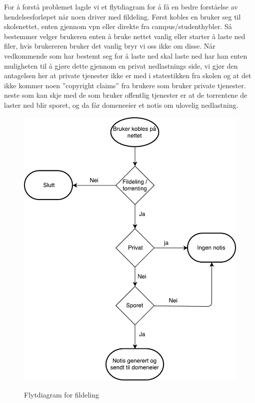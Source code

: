 For å forstå problemet lagde vi et flytdiagram for å få en bedre forståelse av hendelsesforløpet når noen driver med fildeling.
Først kobles en bruker seg til skolenettet, enten gjennom vpn eller direkte fra campus/studenthybler.
Så bestemmer velger brukeren enten å bruke nettet vanlig eller starter å laste ned filer, hvis brukereren bruker det vanlig bryr vi oss ikke om disse. Når vedkommende som har bestemt seg for å laste ned skal laste ned har han enten muligheten til å gjøre dette gjennom en privat nedlastnings side, vi gjør den antagelsen her at private tjenester ikke er med i statestikken fra skolen og at det ikke kommer noen ''copyright claims'' fra brukere som bruker private tjenester. neste som kan skje med de som bruker offentlig tjenester er at de torrentene de laster ned blir sporet, og da får domeneeier et notis om ulovelig nedlastning.
\begin{figure}[H]
    \centering
    \includegraphics[scale=0.5]{case_1/bilder/Flowchart.pdf}
    \label{fig:Flytdiagram}
    \caption[Flytdiagram for fildeling]{Flytdiagram for fildeling}
\end{figure}

